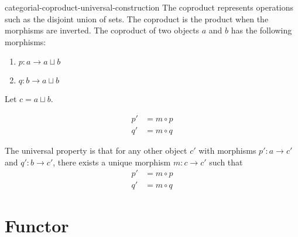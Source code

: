 \documentclass[preview]{standalone}
\begin{document}
\begin{snippet}{categorial-coproduct-universal-construction}
The coproduct represents operations
such as the disjoint union of sets.
The coproduct is the product when the morphisms are inverted.
The coproduct of two objects \(a\) and \(b\) has the following
morphisms:
\begin{enumerate}
    \item \(p:a \to a\sqcup b\)
    \item \(q:b \to a\sqcup b\)
\end{enumerate}

Let \(c=a\sqcup b\).

\begin{minipage}{0.5\textwidth}
\end{minipage}
\begin{minipage}{0.5\textwidth}
    \begin{align*}
        p' &= m \circ p \\
        q' &= m \circ q
    \end{align*}
\end{minipage}

The universal property is that for any other object \(c'\)
with morphisms \(p':a \to c'\) and \(q':b \to c'\),
there exists a unique morphism \(m:c \to c'\)
such that
\begin{align*}
    p' &= m \circ p \\
    q' &= m \circ q
\end{align*}
\end{snippet}

\section{Functor}

\end{document}
